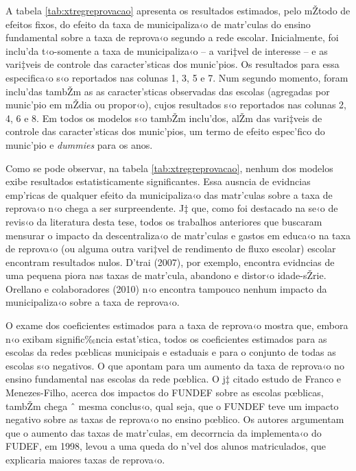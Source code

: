 \documentclass[a4paper, 12pt]{article}
\begin{document}


                             

A tabela \ref{tab:xtregreprovacao} apresenta os resultados estimados, pelo mŽtodo de efeitos fixos, do efeito da taxa de municipaliza‹o de matr’culas do ensino fundamental sobre a taxa de reprova‹o segundo a rede escolar. Inicialmente, foi inclu’da t‹o-somente a taxa de municipaliza‹o -- a vari‡vel de interesse -- e as vari‡veis de controle das caracter’sticas dos munic’pios. Os resultados para essa especifica‹o s‹o reportados nas colunas 1, 3, 5 e 7. Num segundo momento, foram inclu’das tambŽm as as caracter’sticas observadas das escolas (agregadas por munic’pio em mŽdia ou propor‹o), cujos resultados s‹o reportados nas colunas 2, 4, 6 e 8. Em todos os modelos s‹o tambŽm inclu’dos, alŽm das vari‡veis de controle das caracter’sticas dos munic’pios, um termo de efeito espec’fico do munic’pio e \emph{dummies} para os anos.

Como se pode observar, na tabela \ref{tab:xtregreprovacao}, nenhum dos modelos exibe resultados estatisticamente significantes. Essa ausncia de evidncias emp’ricas de qualquer efeito da municipaliza‹o das matr’culas sobre a taxa de reprova‹o n‹o chega a ser surpreendente. J‡ que, como foi destacado na se‹o de revis‹o da literatura desta tese, todos os trabalhos anteriores que buscaram mensurar o impacto da descentraliza‹o de matr’culas e gastos em educa‹o na taxa de reprova‹o (ou alguma outra vari‡vel de rendimento de fluxo escolar) escolar encontram resultados nulos. D'trai (2007), por exemplo, encontra evidncias de uma pequena piora nas taxas de matr’cula, abandono e distor‹o idade-sŽrie. Orellano e colaboradores (2010) n‹o encontra tampouco nenhum impacto da municipaliza‹o sobre a taxa de reprova‹o.

O exame dos coeficientes estimados para a taxa de reprova‹o mostra que, embora n‹o exibam signific‰ncia estat’stica, todos os coeficientes estimados para as escolas da redes pœblicas municipais e estaduais e para o conjunto de todas as escolas s‹o negativos. O que apontam para um aumento da taxa de reprova‹o no ensino fundamental nas escolas da rede pœblica. O j‡ citado estudo de Franco e Menezes-Filho, acerca dos impactos do FUNDEF sobre as escolas pœblicas, tambŽm chega ˆ mesma conclus‹o, qual seja, que o FUNDEF teve um impacto negativo sobre as taxas de reprova‹o no ensino pœblico. Os autores argumentam que o aumento das taxas de matr’culas, em decorrncia da implementa‹o do FUDEF, em 1998, levou a uma queda do n’vel dos alunos matriculados, que explicaria maiores taxas de reprova‹o.
\end{document}
